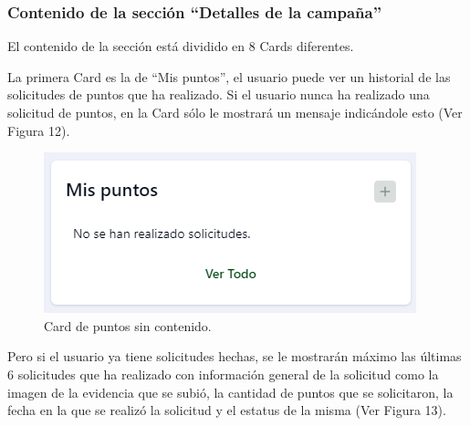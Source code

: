 \subsubsection{Contenido de la sección ``Detalles de la campaña''}
El contenido de la sección está dividido en 8 Cards diferentes.

La primera Card es la de ``Mis puntos'', el usuario puede ver un historial de las solicitudes de puntos que ha realizado. Si el usuario nunca ha realizado una solicitud de puntos, en la Card sólo le mostrará un mensaje indicándole esto (Ver Figura 12).

    \begin{figure}[H]
        \begin{center}
            \includegraphics[scale=0.60]{img/actividades/detalles-campanias/card-puntos.png}
            \caption{Card de puntos sin contenido.}
            \label{fig:card-puntos}
        \end{center}
    \end{figure}

Pero si el usuario ya tiene solicitudes hechas, se le mostrarán máximo las últimas 6 solicitudes que ha realizado con información general de la solicitud como la imagen de la evidencia que se subió, la cantidad de puntos que se solicitaron, la fecha en la que se realizó la solicitud y el estatus de la misma (Ver Figura 13).

